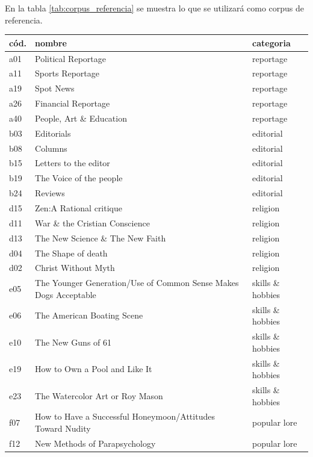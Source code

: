 \documentclass[twoside]{article}
\begin{document}
En la tabla \ref{tab:corpus_referencia} se muestra lo que se
utilizará como corpus de referencia.



    \begin{longtable}{| p{} | p{} | p{}|} 
    \hline
        cód.  & nombre  & categoria  \\ \hline
        a01 & Political Reportage & reportage  \\ \hline
        a11 & Sports Reportage & reportage  \\ \hline
        a19 & Spot News & reportage  \\ \hline
        a26 & Financial Reportage & reportage  \\ \hline
        a40 & People, Art \& Education & reportage \\ \hline
        b03 & Editorials & editorial  \\ \hline
        b08 & Columns & editorial  \\ \hline
        b15 & Letters to the editor & editorial  \\ \hline
        b19 & The Voice of the people & editorial \\ \hline
        b24 & Reviews & editorial \\ \hline
        d15 & Zen:A Rational critique & religion  \\ \hline
        d11 & War \& the Cristian Conscience & religion  \\ \hline
        d13 & The New Science \& The New Faith & religion  \\ \hline
        d04 & The Shape of death & religion  \\ \hline
        d02 & Christ Without Myth & religion  \\ \hline
        e05 & The Younger Generation/Use of Common Sense Makes Dogs Acceptable & skills \& hobbies \\ \hline
        e06 & The American Boating Scene & skills \& hobbies  \\ \hline
        e10 & The New Guns of 61 & skills \& hobbies  \\ \hline
        e19 & How to Own a Pool and Like It & skills \& hobbies  \\ \hline
        e23 & The Watercolor Art or Roy Mason & skills \& hobbies  \\ \hline
        f07 & How to Have a Successful Honeymoon/Attitudes Toward Nudity & popular lore  \\ \hline
        f12 & New Methods of Parapsychology & popular lore  \\ \hline

\end{longtable}
\end{document}

